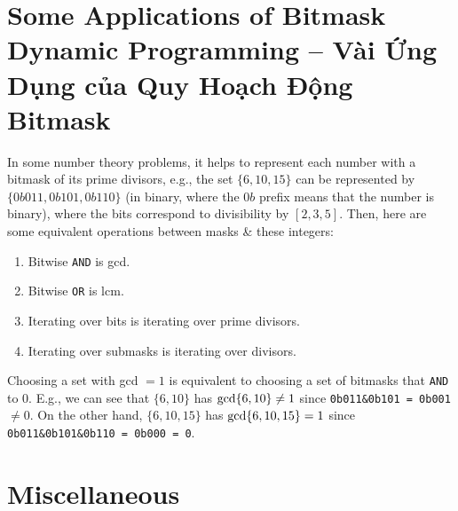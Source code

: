 \documentclass{article}
\begin{document}

\section{Some Applications of Bitmask Dynamic Programming -- Vài Ứng Dụng của Quy Hoạch Động Bitmask}
In some number theory problems, it helps to represent each number with a bitmask of its prime divisors, e.g., the set $\{6,10,15\}$ can be represented by $\{0b011,0b101,0b110\}$ (in binary, where the $0b$ prefix means that the number is binary), where the bits correspond to divisibility by $[2,3,5]$. Then, here are some equivalent operations between masks \& these integers:
\begin{enumerate}
    \item Bitwise {\tt AND} is gcd.
    \item Bitwise {\tt OR} is lcm.
    \item Iterating over bits is iterating over prime divisors.
    \item Iterating over submasks is iterating over divisors.
\end{enumerate}
Choosing a set with gcd $= 1$ is equivalent to choosing a set of bitmasks that {\tt AND} to 0. E.g., we can see that $\{6,10\}$ has ${\rm gcd}\{6,10\}\ne1$ since \verb|0b011&0b101 = 0b001| $\ne 0$. On the other hand, $\{6,10,15\}$ has ${\rm gcd}\{6,10,15\} = 1$ since \verb|0b011&0b101&0b110 = 0b000 = 0|.


\section{Miscellaneous}


\printbibliography[heading=bibintoc]
\end{document}
